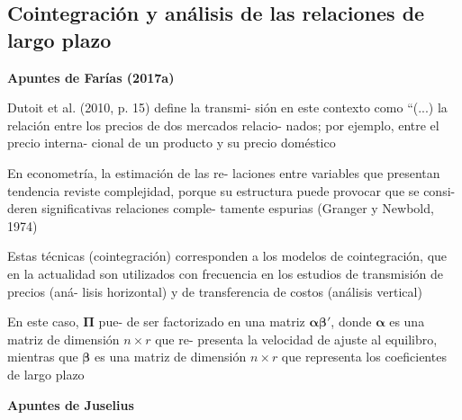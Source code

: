 \documentclass[12pt, twoside]{book}\usepackage[]{graphicx}\usepackage[]{color}
\numberwithin{equation}{section}
\numberwithin{theorem}{section}
\numberwithin{teorema}{section}
\numberwithin{defi}{section}
\numberwithin{prop}{section}
\numberwithin{defi}{section}
\theoremstyle{plain}
\begin{document}
\subsection{Cointegración y análisis de las relaciones de largo plazo}
{\color{red} \textbf{Apuntes de Farías (2017a)}

Dutoit et al. (2010, p. 15) define la transmi-
sión en este contexto como “(...) la relación
entre los precios de dos mercados relacio-
nados; por ejemplo, entre el precio interna-
cional de un producto y su precio doméstico

En econometría, la estimación de las re-
laciones entre variables que presentan
tendencia reviste complejidad, porque su
estructura puede provocar que se consi-
deren significativas relaciones comple-
tamente espurias (Granger y Newbold,
1974)

Estas técnicas (cointegración) corresponden
a los modelos de cointegración, que en la
actualidad son utilizados con frecuencia en
los estudios de transmisión de precios (aná-
lisis horizontal) y de transferencia de costos
(análisis vertical)


En este caso, $\boldsymbol{\Pi}$ pue-
de ser factorizado en una matriz $\boldsymbol{\alpha\beta'}$, donde
$\boldsymbol{\alpha}$ es una matriz de dimensión $n \times r$ que re-
presenta la velocidad de ajuste al equilibro,
mientras que $\boldsymbol{\beta}$ es una matriz de dimensión
$n \times r$ que representa los coeficientes de largo
plazo

{\color{red} \textbf{Apuntes de Juselius}

}}
\end{document}
